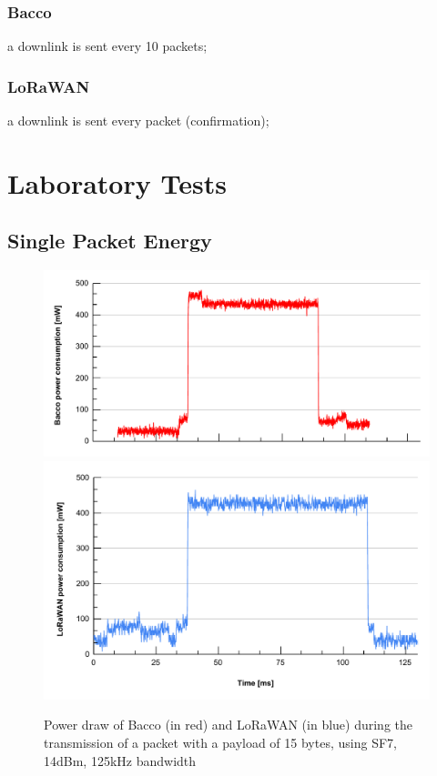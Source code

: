 \subsubsection{Bacco}
a downlink is sent every 10 packets;

\subsubsection{LoRaWAN}
a downlink is sent every packet (confirmation);


\section{Laboratory Tests}

\subsection{Single Packet Energy}

\begin{figure}[ht]
    \centering
    \includegraphics[width=1.0\textwidth]{images/bacco_SF7_14dbm_125khz_power.pdf}\\
    \vspace{-0.7cm}
    \includegraphics[width=1.0\textwidth]{images/lorawan_SF7_14dbm_125khz_power.pdf}
    \caption{Power draw of Bacco (in red) and LoRaWAN (in blue) during the transmission of a packet with a payload of 15
    bytes, using SF7, 14dBm, 125kHz bandwidth}
    \label{bacco SF7}
\end{figure}

